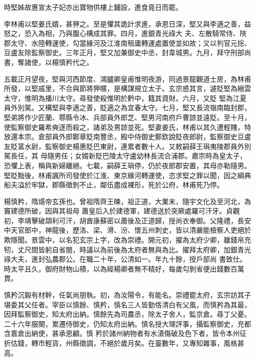 \begin{pinyinscope}
 時堅姊故惠宣太子妃亦出寶物供樓上鋪設，進食竟日而罷。



 李林甫以堅姜氏婿，甚狎之。至是懼其詭計求進，承恩日深，堅又與李適之善，益怒之，恐入為相，乃與腹心構成其罪。四月，進銀青光祿大
 夫、左散騎常侍、陜郡太守、水陸轉運使，勾當緣河及江淮南租庸轉運處置使並如故；又以判官元捴、豆盧友除監察御史。三年正月，堅又加兼御史中丞，封韋城男。九月，拜守刑部尚書，奪諸使，以楊慎矜代之。



 五載正月望夜，堅與河西節度、鴻臚卿皇甫惟明夜游，同過景龍觀道士房，為林甫所發，以堅戚里，不合與節將狎暱，是構謀規立太子。玄宗惑其言，遽貶堅為縉雲太守，惟明為播川太守。尋發使殺惟明於黔中，籍其資財。六月，又貶
 堅為江夏員外別駕。又構堅與李適之善，貶適之為宜春太守。七月，堅又長流嶺南臨封郡，堅弟將作少匠蘭、鄠縣令冰、兵部員外郎芝、堅男河南府戶曹諒並遠貶。至十月，使監察御史羅希奭逐而殺之，諸弟及男諒並死。堅妻姜氏，林甫以其久遭輕賤，特放還本宗。倉部員外郎鄭章貶南豐丞，殿中侍御史鄭欽說貶夜郎尉，監察御史豆盧友貶富水尉，監察御史楊惠貶巴東尉，連累者數十人。又敕嗣薛王琄夷陵郡員外別駕長任，其
 母隨男任；女婿新貶巴陵太守盧幼林長流合浦郡。肅宗時為皇太子，恐懼上表，稱與新婦離絕。七載，嗣薛王琄停，仍於夜郎郡安置，其母亦勒隨男。堅貶黜後，林甫諷所司發使於江淮、東京緣河轉運使，恣求堅之罪以聞，因之綱典船夫溢於牢獄，郡縣徵剝不止，鄰伍盡成裸形，死於公府，林甫死乃停。



 楊慎矜，隋煬帝玄孫也。曾祖隋齊王暕，祖正道，大業末，隨宇文化及至河北，為竇建德所破，因與其祖母
 蕭皇后入於建德軍，建德送於突厥處羅可汗牙。貞觀初，李靖擊破頡利可汗，胡酋康蘇密以蕭後及正道歸，授尚衣奉御。父隆禮，長安中天官郎中，神龍後，歷洛、梁、滑、汾、懷五州刺史，皆以清嚴能檢察人吏絕於欺隱聞。景雲中，以名犯玄宗上字，改為崇禮。開元初，擢為太府少卿，雖錢帛充牣，丈尺間皆躬自省閱，時議以為前後為太府者無與為比。擢拜太府卿，加銀青光祿大夫，進封弘農郡公。在職二十年，公清如一。年九十餘，授戶部尚
 書致仕。時太平且久，御府財物山積，以為經楊卿者無不精好，每歲勾剝省便出錢數百萬貫。



 慎矜沉毅有材幹，任氣尚朋執。初，為汝陽令，有能名。崇禮罷太府，玄宗訪其子堪委其父任者。宰臣以慎餘、慎矜，慎名三人皆勤恪清白有父風，而慎矜為其最，因拜監察御史，知太府出納。慎餘先為司農丞，除太子舍人，監京倉。尋丁父憂。二十六年服闋，累遷侍御史，仍知太府出納。慎名授大理評事，攝監察御史，充都含嘉倉出納使，甚承恩顧。慎
 矜於諸州納物者有水漬傷破及色下者，皆令本州征折估錢，轉市輕貨，州縣徵調，不絕於歲月矣。在臺數年，又專知雜事，風格甚高。




\end{pinyinscope}
